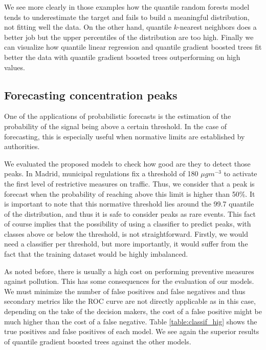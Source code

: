 \documentclass[a4paper,3p,sort&compress]{elsarticle}
\begin{document}
We see more clearly in those examples how the quantile random forests
model tends to underestimate the target and fails to build a
meaningful distribution, not fitting well the data. On the other hand,
quantile $k$-nearest neighbors does a better job but the upper
percentiles of the distribution are too high.  Finally we can
visualize how quantile linear regression and quantile gradient boosted
trees fit better the data with quantile gradient boosted trees
outperforming on high values.

\subsection{Forecasting \no concentration peaks}

One of the applications of probabilistic forecasts is the estimation
of the probability of the signal being above a certain threshold. In
the case of \no forecasting, this is especially useful when normative
limits are established by authorities.

We evaluated the proposed models to check how good are they to detect
those peaks.  In Madrid, municipal regulations fix a threshold of 180
$\mu gm^{-3}$ to activate the first level of restrictive measures on
traffic. Thus, we consider that a \no peak is forecast when the
probability of reaching above this limit is higher than 50\%.  It is
important to note that this normative threshold lies around the 99.7
quantile of the \no distribution, and thus it is safe to consider
peaks as rare events.
This fact of course implies that the possibility of using a classifier
to predict peaks, with classes above or below the threshold, is not
straightforward. Firstly, we would need a classifier per threshold,
but more importantly, it would suffer from the fact that the training
dataset would be highly imbalanced.

As noted before, there is usually a high cost on performing preventive
measures against pollution. This has some consequences for the
evaluation of our models. We must minimize the number of false
positives and false negatives and thus secondary metrics like the ROC
curve are not directly applicable as in this case, depending on the
take of the decision makers, the cost of a false positive might be
much higher than the cost of a false negative. Table
\ref{table:classif_hig} shows the true positives and false positives
of each model. We see again the superior results of quantile gradient
boosted trees against the other models.
\end{document}
